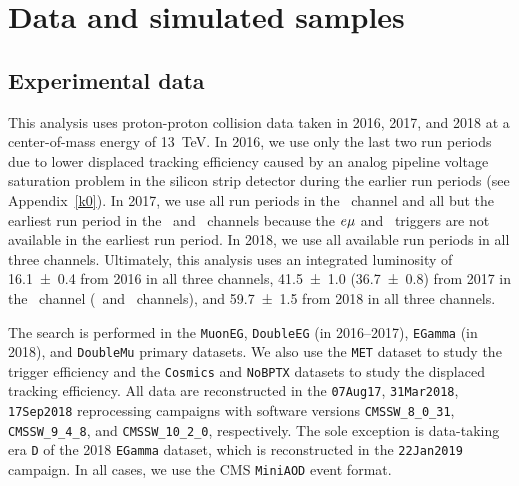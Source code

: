 \section{Data and simulated samples}
\label{samples}
\subsection{Experimental data}
This analysis uses proton-proton collision data taken in 2016, 2017, and 2018 at a center-of-mass energy of \SI{13}{\TeV}. In 2016, we use only the last two run periods due to lower displaced tracking efficiency caused by an analog pipeline voltage saturation problem in the silicon strip detector during the earlier run periods (see Appendix~\ref{k0}). In 2017, we use all run periods in the \Pe\Pe\ channel and all but the earliest run period in the \Pe\Pgm\ and \Pgm\Pgm\ channels because the $e{\mu}$ and \Pgm\Pgm\ triggers are not available in the earliest run period. In 2018, we use all available run periods in all three channels. Ultimately, this analysis uses an integrated luminosity of \SI{16.1\pm0.4}{\fb} from 2016 in all three channels, \SI{41.5\pm1.0}{\fb} (\SI{36.7\pm0.8}{\fb}) from 2017 in the \Pe\Pe\ channel (\Pe\Pgm\ and \Pgm\Pgm\ channels), and \SI{59.7\pm1.5}{\fb} from 2018 in all three channels.

The search is performed in the \texttt{MuonEG}, \texttt{DoubleEG} (in 2016--2017), \texttt{EGamma} (in 2018), and \texttt{DoubleMu} primary datasets. We also use the \texttt{MET} dataset to study the trigger efficiency and the \texttt{Cosmics} and \texttt{NoBPTX} datasets to study the displaced tracking efficiency. All data are reconstructed in the \texttt{07Aug17}, \texttt{31Mar2018}, \texttt{17Sep2018} reprocessing campaigns with software versions \texttt{CMSSW\_8\_0\_31}, \texttt{CMSSW\_9\_4\_8}, and \texttt{CMSSW\_10\_2\_0}, respectively. The sole exception is data-taking era \texttt{D} of the 2018 \texttt{EGamma} dataset, which is reconstructed in the \texttt{22Jan2019} campaign. In all cases, we use the CMS \texttt{MiniAOD} event format.

